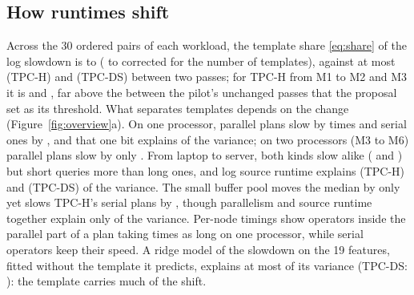 \documentclass{article}
\newcommand{\inputif}[1]{\IfFileExists{#1}{}{}}
\begin{document}
\subsection{How runtimes shift}
\label{sec:shift}
Across the 30 ordered pairs of each workload, the template share \eqref{eq:share} of the log slowdown is \PSRTpchShareMin{} to \PSRTpcdsShareMax{} (\PSRTpchEpsilonTwoMin{} to \PSRTpcdsEpsilonTwoMax{} corrected for the number of templates), against at most \PSRTpchNoiseMax{} (TPC-H) and \PSRTpcdsNoiseMax{} (TPC-DS) between two passes; for TPC-H from M1 to M2 and M3 it is \PSTpchMOnetoMTwoShare{} and \PSTpchMOnetoMThreeShare, far above the \RShiftThreshold{} between the pilot's unchanged passes that the proposal set as its threshold. What separates templates depends on the change (Figure~\ref{fig:overview}a). On one processor, parallel plans slow by \CTwoMOneMTwoShiftParallel{} times and serial ones by \CTwoMOneMTwoShiftSerial, and that one bit explains \PSTpchMOnetoMTwoRTwoParallel{} of the variance; on two processors (M3 to M6) parallel plans slow by only \PSTpchMThreetoMSixParallelX. From laptop to server, both kinds slow alike (\CTwoMOneMThreeShiftParallel{} and \CTwoMOneMThreeShiftSerial) but short queries more than long ones, and log source runtime explains \PSTpchMOnetoMThreeRTwoSize{} (TPC-H) and \PSTpcdsMOnetoMThreeRTwoSize{} (TPC-DS) of the variance. The small buffer pool moves the median by only \PSTpchMOnetoMFiveSlowdown{} yet slows TPC-H's serial plans by \PSTpchMOnetoMFiveSerial, though parallelism and source runtime together explain only \PSTpchMOnetoMFiveRTwoBoth{} of the variance. Per-node timings show operators inside the parallel part of a plan taking \OpProcParallel{} times as long on one processor, while serial operators keep their speed. A ridge model of the slowdown on the 19 features, fitted without the template it predicts, explains at most \PSRTpchRTwoLotMax{} of its variance (TPC-DS: \PSRTpcdsRTwoLotMax): the template carries much of the shift.

\begin{table}[t]
\caption{C1 on each machine's TPC-H pool. Seen: 70/30 split in every template, mean over 5 splits (s.d.\ at most \RCOneSdMax). Unseen: one template held out at a time; ratio to the cost line over held-out templates, bold if its 95\% interval lies below 1. Last row: template mean (seen), global mean (unseen).}
\label{tab:c1}
\centering\small
\setlength{\tabcolsep}{4.5pt}
\inputif{results/report/table_c1.tex}
\end{table}
\end{document}

